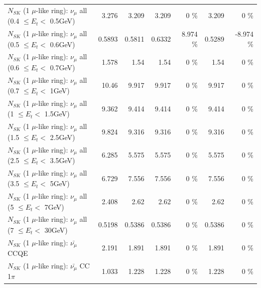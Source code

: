 \begin{table}
\begin{tabular}{| l | r | r | r  r | r  r |}
       $N_{SK}$ (1 $\mu$-like ring): $\nu_{\mu}$ all (0.4 $\leq E_{t} <$ 0.5GeV) &           3.276 &           3.209 &           3.209 &        0 \%  &           3.209 &        0 \%  \\ 
       $N_{SK}$ (1 $\mu$-like ring): $\nu_{\mu}$ all (0.5 $\leq E_{t} <$ 0.6GeV) &          0.5893 &          0.5811 &          0.6332 &    8.974 \%  &          0.5289 &   -8.974 \%  \\ 
       $N_{SK}$ (1 $\mu$-like ring): $\nu_{\mu}$ all (0.6 $\leq E_{t} <$ 0.7GeV) &           1.578 &            1.54 &            1.54 &        0 \%  &            1.54 &        0 \%  \\ 
         $N_{SK}$ (1 $\mu$-like ring): $\nu_{\mu}$ all (0.7 $\leq E_{t} <$ 1GeV) &           10.46 &           9.917 &           9.917 &        0 \%  &           9.917 &        0 \%  \\ 
         $N_{SK}$ (1 $\mu$-like ring): $\nu_{\mu}$ all (1 $\leq E_{t} <$ 1.5GeV) &           9.362 &           9.414 &           9.414 &        0 \%  &           9.414 &        0 \%  \\ 
       $N_{SK}$ (1 $\mu$-like ring): $\nu_{\mu}$ all (1.5 $\leq E_{t} <$ 2.5GeV) &           9.824 &           9.316 &           9.316 &        0 \%  &           9.316 &        0 \%  \\ 
       $N_{SK}$ (1 $\mu$-like ring): $\nu_{\mu}$ all (2.5 $\leq E_{t} <$ 3.5GeV) &           6.285 &           5.575 &           5.575 &        0 \%  &           5.575 &        0 \%  \\ 
         $N_{SK}$ (1 $\mu$-like ring): $\nu_{\mu}$ all (3.5 $\leq E_{t} <$ 5GeV) &           6.729 &           7.556 &           7.556 &        0 \%  &           7.556 &        0 \%  \\ 
           $N_{SK}$ (1 $\mu$-like ring): $\nu_{\mu}$ all (5 $\leq E_{t} <$ 7GeV) &           2.408 &            2.62 &            2.62 &        0 \%  &            2.62 &        0 \%  \\ 
          $N_{SK}$ (1 $\mu$-like ring): $\nu_{\mu}$ all (7 $\leq E_{t} <$ 30GeV) &          0.5198 &          0.5386 &          0.5386 &        0 \%  &          0.5386 &        0 \%  \\ 
\hline
\hline
\hline
                              $N_{SK}$ (1 $\mu$-like ring): $\bar{\nu_\mu}$ CCQE &           2.191 &           1.891 &           1.891 &        0 \%  &           1.891 &        0 \%  \\ 
                         $N_{SK}$ (1 $\mu$-like ring): $\bar{\nu_\mu}$ CC 1$\pi$ &           1.033 &           1.228 &           1.228 &        0 \%  &           1.228 &        0 \%  \\ 

\end{tabular}
\end{table}
